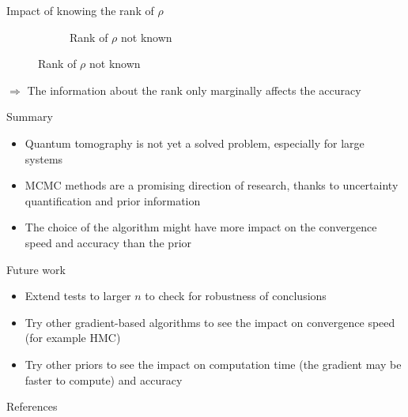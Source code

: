 \documentclass{beamer}
\begin{document}
\begin{frame}{Impact of knowing the rank of $\rho$}
\begin{figure}[H]
\begin{subfigure}[b]{0.49\textwidth}
            \caption{Rank of $\rho$ not known}
    
            \label{fig:rank-no-info-sub}
    
        \end{subfigure}
        
        \label{fig:rank-info}
    
    \end{figure}
    $\Longrightarrow$ The information about the rank only marginally affects the accuracy
\end{frame}

\begin{frame}{Summary}
    \begin{itemize}
        \item Quantum tomography is not yet a solved problem, especially for large  systems
        \item MCMC methods are a promising direction of research, thanks to uncertainty quantification and prior information 
        \item The choice of the algorithm might have more impact on the convergence speed and accuracy than the prior
    \end{itemize}
\end{frame}
\begin{frame}{Future work}
    \begin{itemize}
        \item Extend tests to larger $n$ to check for robustness of conclusions
        \item Try other gradient-based algorithms to see the impact on convergence speed (for example HMC)
        \item Try other priors to see the impact on computation time (the gradient may be faster to compute) and accuracy
    \end{itemize}
\end{frame}
\begin{frame}{References}
    \printbibliography
\end{frame}
\end{document}
